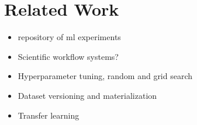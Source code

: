 \section{Related Work} \label{sec-related-work}
\begin{itemize}
\item repository of ml experiments
\item Scientific workflow systems?
\item Hyperparameter tuning, random and grid search
\item Dataset versioning and materialization \cite{bhattacherjee2015principles, vartak2018mistique}
\item Transfer learning
\end{itemize}


